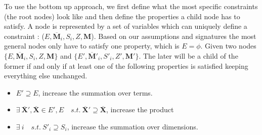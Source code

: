 \documentclass{article}
\newcommand{\TX}{\textbf{X}\xspace}
\newcommand{\TY}{\textbf{Y}\xspace}
\newcommand{\TM}{\textbf{M}\xspace}
\begin{document}

To use the bottom up approach, we first define what the most specific constraints (the root nodes) look like and then define the properties a child node has to satisfy. A node is represented by a set of variables which can uniquely define a constraint : ($E, \overline{\TM}_i,S_{i}, Z, \TM$). Based on our assumptions and signatures the most general nodes only have to satisfy one property, which is $E=\phi$.
Given two nodes $\{E, \overline{\TM}_i,S_{i}, Z, \TM\}$ and $\{E', \overline{\TM}'_i,S'_{i}, Z', \TM' \}$. The later will be a child of the former if and only if at least one of the following properties is satisfied keeping everything else unchanged.
\begin{itemize}
\item $E' \supseteq E$, increase the summation over terms.
\item $\exists \ \overline{\TX}',\overline{\TX} \in E',E \quad s.t. \  \overline{\TX}' \supseteq \overline{\TX}$, increase the product 
\item $\exists \ i \quad s.t. \ S'_i \supseteq S_i$, increase the summation over dimensions.
\end{itemize}
\end{document}

